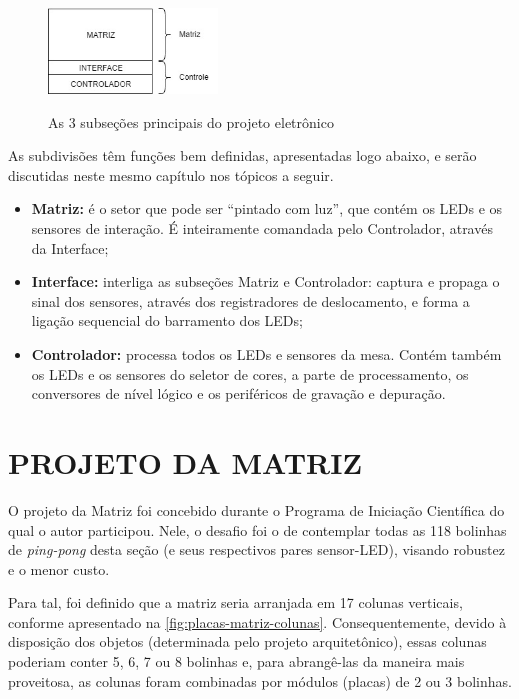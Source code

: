 \begin{figure}[H]
    \centering
    \caption{As 3 subseções principais do projeto eletrônico}
    \includegraphics[width=0.40\textwidth]{./dados/figuras/secoes}
    \label{fig:subsecoes}
\end{figure}

As subdivisões têm funções bem definidas, apresentadas logo abaixo, e serão discutidas neste mesmo capítulo nos tópicos a seguir.

\begin{itemize}
    \item \textbf{Matriz:} é o setor que pode ser ``pintado com luz'', que contém os LEDs e os sensores de interação. É inteiramente comandada pelo Controlador, através da Interface;
    \item \textbf{Interface:} interliga as subseções Matriz e Controlador: captura e propaga o sinal dos sensores, através dos registradores de deslocamento, e forma a ligação sequencial do barramento dos LEDs;
    \item \textbf{Controlador:} processa todos os LEDs e sensores da mesa. Contém também os LEDs e os sensores do seletor de cores, a parte de processamento, os conversores de nível lógico e os periféricos de gravação e depuração.
\end{itemize}



\section{PROJETO DA MATRIZ}
\label{sec:matriz}

O projeto da Matriz foi concebido durante o Programa de Iniciação Científica do qual o autor participou. Nele, o desafio foi o de contemplar todas as 118 bolinhas de \emph{ping-pong} desta seção (e seus respectivos pares sensor-LED), visando robustez e o menor custo.

Para tal, foi definido que a matriz seria arranjada em 17 colunas verticais, conforme apresentado na \autoref{fig:placas-matriz-colunas}. Consequentemente, devido à disposição dos objetos (determinada pelo projeto arquitetônico), essas colunas poderiam conter 5, 6, 7 ou 8 bolinhas e, para abrangê-las da maneira mais proveitosa, as colunas foram combinadas por módulos (placas) de 2 ou 3 bolinhas.

